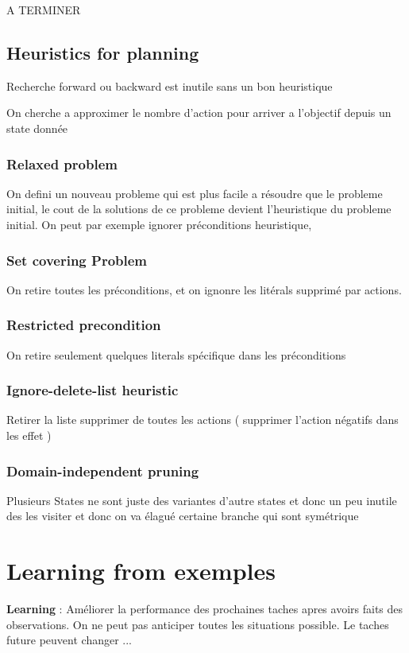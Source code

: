 \documentclass[12pt]{article}
\begin{document}
			A TERMINER
			
	\subsection{Heuristics for planning}
	
		Recherche forward ou backward est inutile sans un bon heuristique
		
		On cherche a approximer le nombre d'action pour arriver a l'objectif depuis un state donnée
		
		\subsubsection{Relaxed problem}
			On defini un nouveau probleme qui est plus facile a résoudre que le probleme initial, le cout de la solutions de ce probleme devient l'heuristique du probleme initial. On peut par exemple ignorer préconditions heuristique, 
		
		\subsubsection{Set covering Problem}
		
		On retire toutes les préconditions, et on ignonre les litérals supprimé par actions.
		
		\subsubsection{Restricted precondition}
		On retire seulement quelques literals spécifique dans les préconditions
		
		\subsubsection{Ignore-delete-list heuristic}
		Retirer la liste supprimer de toutes les actions ( supprimer l'action négatifs dans les effet )
		
		\subsubsection{Domain-independent pruning}
		Plusieurs States ne sont juste des variantes d'autre states et donc un peu inutile des les visiter et donc on va élagué certaine branche qui sont symétrique
			
		
			
\section{Learning from exemples}
	\textbf{Learning} : Améliorer la performance des prochaines taches apres avoirs faits des observations. On ne peut pas anticiper toutes les situations possible. Le taches future peuvent changer ...
	
\end{document}
